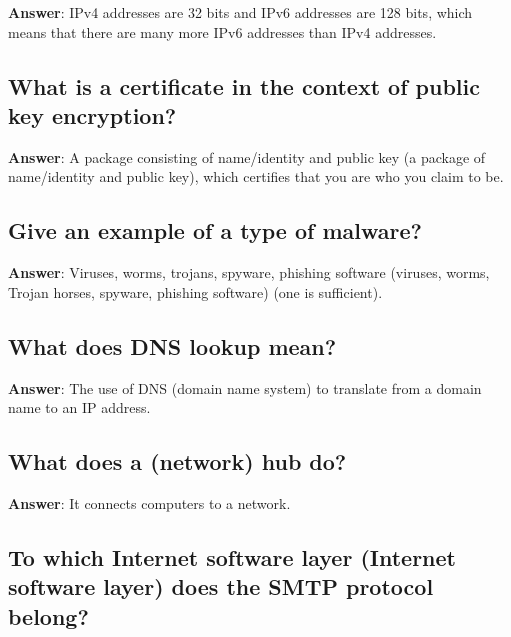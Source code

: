 \documentclass[a4paper,11pt,oneside]{article}
\begin{document}
\begin{sloppypar}
\label{q:140:sa:en:True}

\textbf{Answer}: IPv4 addresses are 32 bits and IPv6 addresses are 128 bits, which means that there are many more IPv6 addresses than IPv4 addresses.



\subsection{What is a certificate in the context of public key encryption?}

\label{q:141:sa:en:True}

\textbf{Answer}: A package consisting of name/identity and public key (a package of name/identity and public key), which certifies that you are who you claim to be.



\subsection{Give an example of a type of malware?}

\label{q:142:sa:en:True}

\textbf{Answer}: Viruses, worms, trojans, spyware, phishing software (viruses, worms, Trojan horses, spyware, phishing software) (one is sufficient).



\subsection{What does DNS lookup mean?}

\label{q:143:sa:en:True}

\textbf{Answer}: The use of DNS (domain name system) to translate from a domain name to an IP address.



\subsection{What does a (network) hub do?}

\label{q:144:sa:en:True}

\textbf{Answer}: It connects computers to a network.



\subsection{To which Internet software layer (Internet software layer) does the SMTP protocol belong?}


\end{sloppypar}
\end{document}
